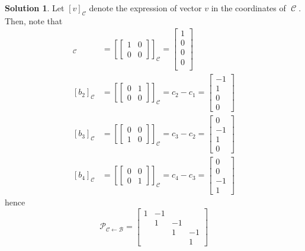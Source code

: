 \documentclass{amsart}
\theoremstyle{definition}
\theoremstyle{definition}
\newtheorem*{solution}{Solution}
\DeclareMathOperator{\1}{\mathbbm{1}}
\DeclareMathOperator{\CC}{\mathcal{C}}
\begin{document}
\begin{enumerate}[itemsep = 2mm]
\begin{enumerate}[label=\arabic*.]
			\begin{solution}
				Let $[v]_{\CC}$ denote the expression of vector $v$ in the coordinates of $\CC$. Then, note that
				\begin{align*}
				[b_1]_{\CC} &= \left[ \begin{bmatrix}
				1&0\\
				0&0
				\end{bmatrix}\right]_{\CC} = \begin{bmatrix}
				1 \\ 0 \\ 0 \\ 0 \\
				\end{bmatrix} \\
				[b_2]_{\CC} &= \left[
				\begin{bmatrix}
				0&1\\
				0&0
				\end{bmatrix} \right]_{\CC} = c_2 - c_1 = \begin{bmatrix}
				-1 \\ 1 \\ 0 \\ 0
				\end{bmatrix} \\
				[b_3]_{\CC} &= \left[ \begin{bmatrix}
				0&0\\
				1&0
				\end{bmatrix} \right]_{\CC} = c_3 - c_2 = \begin{bmatrix}
				0 \\ -1 \\ 1 \\ 0 
				\end{bmatrix} \\
				[b_4]_{\CC} &= \left[ \begin{bmatrix}
				0&0\\
				0&1
				\end{bmatrix} \right]_{\CC}  = c_4 - c_3 = \begin{bmatrix}
				0 \\ 0 \\ -1 \\ 1
				\end{bmatrix} 
				\end{align*}
				hence
				\begin{equation}
					\label{eqchangeofbasis}
					\mathcal{P}_{\mathcal{C}\leftarrow \mathcal{B}} = \begin{bmatrix}
					1 & -1 & & \\ & 1 & -1 & \\ & & 1 & -1 \\ & & & 1
					\end{bmatrix}
				\end{equation}
			\end{solution}
			

\end{enumerate}
\end{enumerate}
\end{document}
